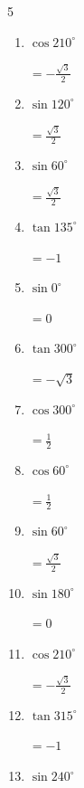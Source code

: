 \begin{multicols}{5}
\begin{enumerate}
        $\displaystyle =\sqrt{3}$

  \item $\displaystyle \cos{210^\circ}$

        $\displaystyle =-\frac{\sqrt{3}}{2}$

  \item $\displaystyle \sin{120^\circ}$

        $\displaystyle =\frac{\sqrt{3}}{2}$

\columnbreak %

  \item $\displaystyle \sin{60^\circ}$

        $\displaystyle =\frac{\sqrt{3}}{2}$

  \item $\displaystyle \tan{135^\circ}$

        $\displaystyle =-1$

  \item $\displaystyle \sin{0^\circ}$

        $\displaystyle =0$

  \item $\displaystyle \tan{300^\circ}$

        $\displaystyle =-\sqrt{3}$

  \item $\displaystyle \cos{300^\circ}$

        $\displaystyle =\frac{1}{2}$

  \item $\displaystyle \cos{60^\circ}$

        $\displaystyle =\frac{1}{2}$

  \item $\displaystyle \sin{60^\circ}$

        $\displaystyle =\frac{\sqrt{3}}{2}$

  \item $\displaystyle \sin{180^\circ}$

        $\displaystyle =0$

  \item $\displaystyle \cos{210^\circ}$

        $\displaystyle =-\frac{\sqrt{3}}{2}$

  \item $\displaystyle \tan{315^\circ}$

        $\displaystyle =-1$

  \item $\displaystyle \sin{240^\circ}$


\end{enumerate}
\end{multicols}
